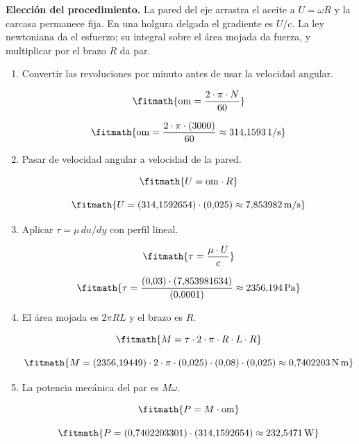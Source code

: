 \noindent\textbf{Elección del procedimiento.} La pared del eje arrastra el aceite a $U=\omega R$ y la carcasa permanece fija. En una holgura delgada el gradiente es $U/c$. La ley newtoniana da el esfuerzo; su integral sobre el área mojada da fuerza, y multiplicar por el brazo $R$ da par.

\begin{enumerate}

\item Convertir las revoluciones por minuto antes de usar la velocidad angular.

\[\fitmath{\mathrm{om}=\frac{2\cdot \pi\cdot N}{60}}\]

\[\fitmath{\mathrm{om}=\frac{2\cdot \pi\cdot (3000)}{60}\approx 314{,}1593\,\mathrm{1/s}}\]

\item Pasar de velocidad angular a velocidad de la pared.

\[\fitmath{U=\mathrm{om}\cdot R}\]

\[\fitmath{U=(314{,}1592654)\cdot (0{,}025)\approx 7{,}853982\,\mathrm{m/s}}\]

\item Aplicar $\tau=\mu\,du/dy$ con perfil lineal.

\[\fitmath{\tau=\frac{\mu\cdot U}{c}}\]

\[\fitmath{\tau=\frac{(0{,}03)\cdot (7{,}853981634)}{(0{,}0001)}\approx 2356{,}194\,\mathrm{Pa}}\]

\item El área mojada es $2\pi RL$ y el brazo es $R$.

\[\fitmath{M=\tau\cdot 2\cdot \pi\cdot R\cdot L\cdot R}\]

\[\fitmath{M=(2356{,}19449)\cdot 2\cdot \pi\cdot (0{,}025)\cdot (0{,}08)\cdot (0{,}025)\approx 0{,}7402203\,\mathrm{N\,m}}\]

\item La potencia mecánica del par es $M\omega$.

\[\fitmath{P=M\cdot \mathrm{om}}\]

\[\fitmath{P=(0{,}7402203301)\cdot (314{,}1592654)\approx 232{,}5471\,\mathrm{W}}\]

\end{enumerate}
